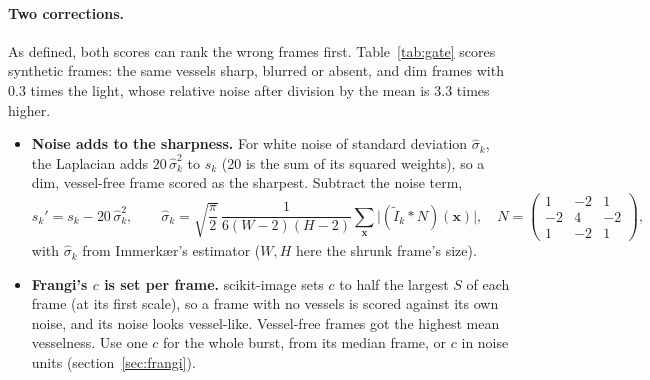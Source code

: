 \documentclass[11pt]{article}
\newcommand{\x}{\mathbf{x}}
\begin{document}
\paragraph{Two corrections.} As defined, both scores can rank the wrong frames first. Table~\ref{tab:gate} scores
synthetic frames: the same vessels sharp, blurred or absent, and dim frames with 0.3 times the light, whose
relative noise after division by the mean is 3.3 times higher.
\begin{itemize}
  \item \textbf{Noise adds to the sharpness.} For white noise of standard deviation $\hat\sigma_k$, the Laplacian
        adds $20\,\hat\sigma_k^2$ to $s_k$ (20 is the sum of its squared weights), so a dim, vessel-free frame
        scored as the sharpest. Subtract the noise term,
        \begin{equation}
          s_k' = s_k - 20\,\hat\sigma_k^2,
          \qquad
          \hat\sigma_k = \sqrt{\frac{\pi}{2}}\, \frac{1}{6(W-2)(H-2)} \sum_\x \bigl|(\tilde I_k * N)(\x)\bigr|,
          \quad
          N = \left(\begin{smallmatrix} 1 & -2 & 1 \\ -2 & 4 & -2 \\ 1 & -2 & 1 \end{smallmatrix}\right),
        \end{equation}
        with $\hat\sigma_k$ from Immerk{\ae}r's estimator ($W, H$ here the shrunk frame's size).
  \item \textbf{Frangi's $c$ is set per frame.} scikit-image sets $c$ to half the largest $S$ of each frame (at its
        first scale), so a frame with no vessels is scored against its own noise, and its noise looks vessel-like.
        Vessel-free frames got the highest mean vesselness. Use one $c$ for the whole burst, from its median frame,
        or $c$ in noise units (section~\ref{sec:frangi}).
\end{itemize}
\end{document}
